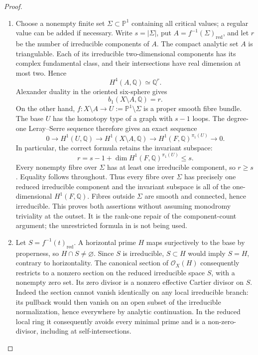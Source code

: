 \begin{proof}

\begin{enumerate}[label={$\langle1\rangle$\arabic*.},leftmargin=*]
\item Choose a nonempty finite set $\Sigma\subset\mathbb P^1$ containing
all critical values; a regular value can be added if necessary.
Write $s=|\Sigma|$, put $A=f^{-1}(\Sigma)_{\mathrm{red}}$,
and let $r$ be the number of irreducible components of $A$.
The compact analytic set $A$ is triangulable.  Each of its
irreducible two-dimensional components has its complex
fundamental class, and their intersections have real dimension
at most two.  Hence
\[
 H^4(A,\mathbb Q)\simeq\mathbb Q^r.
\]
Alexander duality in the oriented six-sphere gives
\[
 b_1(X\setminus A,\mathbb Q)=r.
\]
On the other hand, $f:X\setminus A\to U:=\mathbb P^1\setminus\Sigma$
is a proper smooth fibre bundle.  The base $U$ has the homotopy
type of a graph with $s-1$ loops.  The degree-one Leray--Serre
sequence therefore gives an exact sequence
\[
 0\longrightarrow H^1(U,\mathbb Q)
 \longrightarrow H^1(X\setminus A,\mathbb Q)
 \longrightarrow H^1(F,\mathbb Q)^{\pi_1(U)}
 \longrightarrow0.
\]
In particular, the correct formula retains the invariant
subspace:
\[
 r=s-1+\dim H^1(F,\mathbb Q)^{\pi_1(U)}\le s.
\]
Every nonempty fibre over $\Sigma$ has at least one irreducible
component, so $r\ge s$.  Equality follows throughout.  Thus
every fibre over $\Sigma$ has precisely one reduced irreducible
component and the invariant subspace is all of the
one-dimensional $H^1(F,\mathbb Q)$.  Fibres outside $\Sigma$ are
smooth and connected, hence irreducible.  This proves both
assertions without assuming monodromy triviality at the outset.
It is the rank-one repair of the component-count argument;
the unrestricted formula in \citet[Lemma~4.2]{CDP2020D} is not
being used.

\item Let $S=f^{-1}(t)_{\mathrm{red}}$.  A horizontal prime $H$ maps
surjectively to the base by properness, so $H\cap S\ne\varnothing$.
Since $S$ is irreducible, $S\subset H$ would imply $S=H$,
contrary to horizontality.  The canonical section of
$\mathcal O_X(H)$ consequently restricts to a nonzero section
on the reduced irreducible space $S$, with a nonempty zero
set.  Its zero divisor is a nonzero effective Cartier divisor
on $S$.  Indeed the section cannot vanish identically on
any local irreducible branch: its pullback would then vanish
on an open subset of the irreducible normalization, hence
everywhere by analytic continuation.  In the reduced local
ring it consequently avoids every minimal prime and is a
non-zero-divisor, including at self-intersections.


\end{enumerate}
\end{proof}
